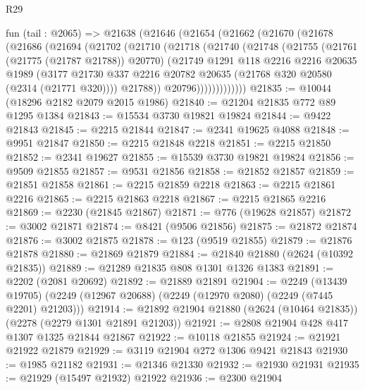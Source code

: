 \begin{lexlean}{R29}
\begin{coremodule}
    fun (tail : @2065) =>
    @21638
      (@21646
        (@21654
          (@21662
            (@21670
              (@21678
                (@21686
                  (@21694
                    (@21702
                      (@21710
                        (@21718
                          (@21740
                            (@21748
                              (@21755
                                (@21761 (@21775 (@21787 @21788)) @20770)
                                (@21749
                                  @1291
                                  @118
                                  @2216
                                  @2216
                                  @20635
                                  @1989
                                  (@3177
                                    @21730
                                    @337
                                    @2216
                                    @20782
                                    @20635
                                    (@21768 @320 @20580 (@2314 (@21771 @320))))
                                  @21788))
                              @20796)))))))))))))
@21835 := @10044 (@18296 @2182 @2079 @2015 @1986)
@21840 := @21204 @21835 @772 @89 @1295 @1384
@21843 := @15534 @3730 @19821 @19824
@21844 := @9422 @21843
@21845 := @2215 @21844
@21847 := @2341 @19625 @4088
@21848 := @9951 @21847
@21850 := @2215 @21848 @2218
@21851 := @2215 @21850
@21852 := @2341 @19627
@21855 := @15539 @3730 @19821 @19824
@21856 := @9509 @21855
@21857 := @9531 @21856
@21858 := @21852 @21857
@21859 := @21851 @21858
@21861 := @2215 @21859 @2218
@21863 := @2215 @21861 @2216
@21865 := @2215 @21863 @2218
@21867 := @2215 @21865 @2216
@21869 := @2230 (@21845 @21867)
@21871 := @776 (@19628 @21857)
@21872 := @3002 @21871
@21874 := @8421 (@9506 @21856)
@21875 := @21872 @21874
@21876 := @3002 @21875
@21878 := @123 (@9519 @21855)
@21879 := @21876 @21878
@21880 := @21869 @21879
@21884 := @21840 @21880 (@2624 (@10392 @21835))
@21889 := @21289 @21835 @808 @1301 @1326 @1383
@21891 := @2202 (@2081 @20692)
@21892 := @21889 @21891
@21904 := @2249
    (@13439 @19705)
    (@2249 (@12967 @20688) (@2249 (@12970 @2080) (@2249 (@7445 @2201) @21203)))
@21914 := @21892 @21904 @21880 (@2624 (@10464 @21835)) (@2278 (@2279 @1301 @21891 @21203))
@21921 := @2808 @21904 @428 @417 @1307 @1325 @21844 @21867
@21922 := @10118 @21855
@21924 := @21921 @21922 @21879
@21929 := @3119 @21904 @272 @1306 @9421 @21843
@21930 := @1985 @21182
@21931 := @21346 @21330
@21932 := @21930 @21931
@21935 := @21929 (@15497 @21932) @21922
@21936 := @2300 @21904

\end{coremodule}
\end{lexlean}
